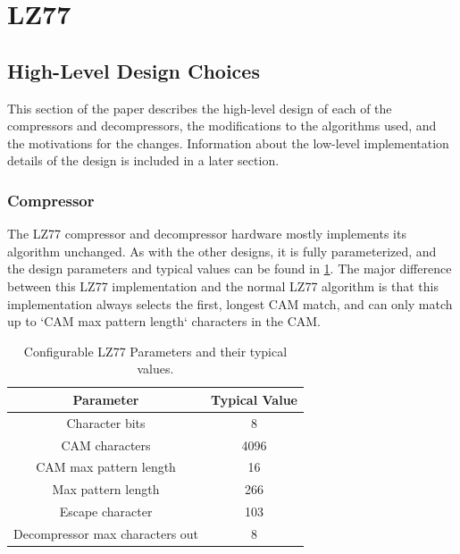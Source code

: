 \documentclass[doublespace,nopageskip]{VTthesis}
\begin{document}
\section{LZ77}\label{se:lz77}
\subsection{High-Level Design Choices}\label{se:lz77_design_choices}
This section of the paper describes the high-level design of each of the compressors and decompressors, the modifications to the algorithms used, and the motivations for the changes. Information about the low-level implementation details of the design is included in a later section.

\subsubsection{Compressor}\label{sss:lz77_compressor_design}
The LZ77 compressor and decompressor hardware mostly implements its algorithm unchanged. As with the other designs, it is fully parameterized, and the design parameters and typical values can be found in \ref{tab:lz77-configuration-table}. The major difference between this LZ77 implementation and the normal LZ77 algorithm is that this implementation always selects the first, longest CAM match, and can only match up to `CAM max pattern length` characters in the CAM.

\begin{table}[htb]
	\centering
	\caption{Configurable LZ77 Parameters and their typical values.}
	\begin{tabular}{cc}
	    \toprule
	    Parameter & Typical Value \\
	    \midrule
	    Character bits & 8 \\
	    \midrule
	    CAM characters & 4096 \\
	    \midrule
	    CAM max pattern length & 16 \\
	    \midrule
	    Max pattern length & 266 \\ 
	    \midrule
	    Escape character & 103 \\ 
	    \midrule
	    Decompressor max characters out & 8\\
	    \bottomrule
	\end{tabular}
	\label{tab:lz77-configuration-table}
\end{table}
\end{document}
